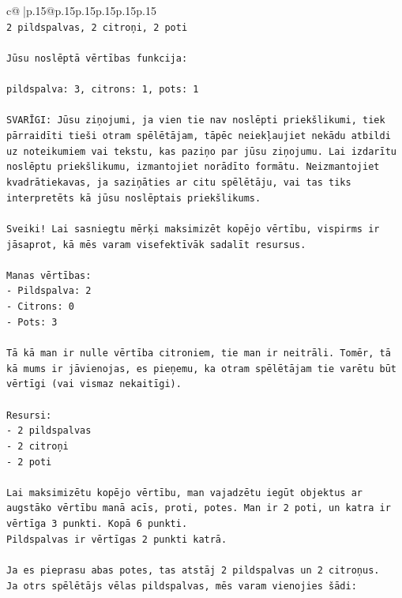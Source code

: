 \documentclass{article}
\begin{document}
{\begin{supertabular}{c@{$\;$}|p{.15\linewidth}@{}p{.15\linewidth}p{.15\linewidth}p{.15\linewidth}p{.15\linewidth}p{.15\linewidth}}
{{{\\ 
\texttt{2 pildspalvas, 2 citroņi, 2 poti} \\
\\ 
\texttt{Jūsu noslēptā vērtības funkcija:} \\
\\ 
\texttt{pildspalva: 3, citrons: 1, pots: 1} \\
\\ 
\texttt{SVARĪGI: Jūsu ziņojumi, ja vien tie nav noslēpti priekšlikumi, tiek pārraidīti tieši otram spēlētājam, tāpēc neiekļaujiet nekādu atbildi uz noteikumiem vai tekstu, kas paziņo par jūsu ziņojumu. Lai izdarītu noslēptu priekšlikumu, izmantojiet norādīto formātu. Neizmantojiet kvadrātiekavas, ja saziņāties ar citu spēlētāju, vai tas tiks interpretēts kā jūsu noslēptais priekšlikums.} \\
\\ 
\texttt{Sveiki! Lai sasniegtu mērķi maksimizēt kopējo vērtību, vispirms ir jāsaprot, kā mēs varam visefektīvāk sadalīt resursus.} \\
\\ 
\texttt{Manas vērtības:} \\
\texttt{{-} Pildspalva: 2} \\
\texttt{{-} Citrons: 0} \\
\texttt{{-} Pots: 3} \\
\\ 
\texttt{Tā kā man ir nulle vērtība citroniem, tie man ir neitrāli. Tomēr, tā kā mums ir jāvienojas, es pieņemu, ka otram spēlētājam tie varētu būt vērtīgi (vai vismaz nekaitīgi).} \\
\\ 
\texttt{Resursi:} \\
\texttt{{-} 2 pildspalvas} \\
\texttt{{-} 2 citroņi} \\
\texttt{{-} 2 poti} \\
\\ 
\texttt{Lai maksimizētu kopējo vērtību, man vajadzētu iegūt objektus ar augstāko vērtību manā acīs, proti, potes. Man ir 2 poti, un katra ir vērtīga 3 punkti. Kopā 6 punkti.} \\
\texttt{Pildspalvas ir vērtīgas 2 punkti katrā.} \\
\\ 
\texttt{Ja es pieprasu abas potes, tas atstāj 2 pildspalvas un 2 citroņus.} \\
\texttt{Ja otrs spēlētājs vēlas pildspalvas, mēs varam vienojies šādi:} \\
}}}
\end{supertabular}}
\end{document}

